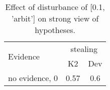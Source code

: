 \begin{table}\begin{tabular}{l|cc}\toprule\multirow{2}{*}{Evidence} & \multicolumn{2}{c}{stealing}\\& {K2} & {Dev}\\\midrule
no evidence, 0 & 0.57&0.6\\\bottomrule\end{tabular}\caption{Effect of disturbance of [0.1, 'arbit'] on strong view of hypotheses.}\end{table}